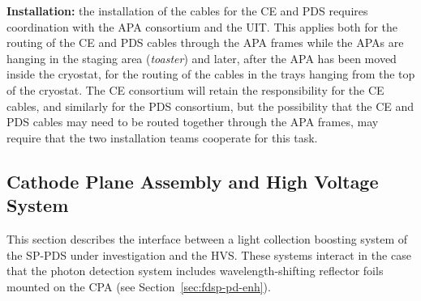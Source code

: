 \textbf{Installation:} the installation of the cables for the CE and PDS requires coordination with the APA consortium and the UIT. This applies both for the routing of the CE and PDS cables through the APA frames while the APAs are hanging in the staging area ({\it toaster}) and later, after the APA has been moved inside the cryostat, for the routing of the cables in the trays hanging from the top of the cryostat. The CE consortium will retain the responsibility for the CE cables, and similarly for the PDS consortium, but the possibility that the CE and PDS cables may need to be routed together through the APA frames, may require that the two installation teams cooperate for this task.


\subsection{Cathode Plane Assembly and High Voltage System}
\label{sec:fdsp-pd-intfc-le}

This section describes the interface between a light collection boosting system of the SP-PDS  under investigation and the HVS. These systems interact in the case that the photon detection system includes wavelength-shifting reflector foils mounted on the CPA (see Section~\ref{sec:fdsp-pd-enh}).


